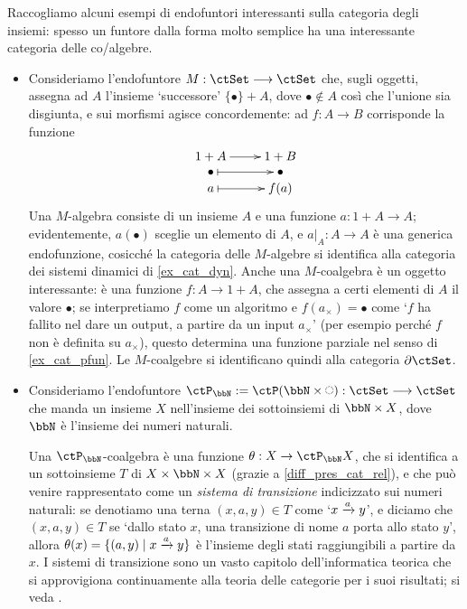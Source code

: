 \begin{examples}
	Raccogliamo alcuni esempi di endofuntori interessanti sulla categoria degli insiemi: spesso un funtore dalla forma molto semplice ha una interessante categoria delle co/algebre.
	\begin{itemize}
		\item Consideriamo l'endofuntore \(M : \ctSet\fun\ctSet\) che, sugli oggetti, assegna ad \(A\) l'insieme `successore' \(\{\bullet\}+A\), dove \(\bullet\notin A\) così che l'unione sia disgiunta, e sui morfismi agisce concordemente: ad \(f : A\to B\) corrisponde la funzione
		      \[\xymatrix@R=0mm{
			      1+A \ar[r] & 1+B \\
			      \bullet \ar@{|->}[r] & \bullet \\
			      a \ar@{|->}[r] & f(a)
			      }\]
		      Una \(M\)-algebra consiste di un insieme \(A\) e una funzione \(a : 1+A\to A\); evidentemente, \(a(\bullet)\) sceglie un elemento di \(A\), e \(a|_A : A\to A\) è una generica endofunzione, cosicché la categoria delle \(M\)-algebre si identifica alla categoria dei sistemi dinamici di \ref{ex_cat_dyn}. Anche una \(M\)-coalgebra è un oggetto interessante: è una funzione \(f : A\to 1+A\), che assegna a certi elementi di \(A\) il valore \(\bullet\); se interpretiamo \(f\) come un algoritmo e \(f(a_\times)=\bullet\) come `\(f\) ha fallito nel dare un output, a partire da un input \(a_\times\)' (per esempio perché \(f\) non è definita su \(a_\times\)), questo determina una funzione parziale nel senso di \ref{ex_cat_pfun}. Le \(M\)-coalgebre si identificano quindi alla categoria \(\pSet\).
		\item Consideriamo l'endofuntore \(\ctP_\bbN:=\ctP(\bbN\times\blank):\ctSet\fun\ctSet\) che manda un insieme \(X\) nell'insieme dei sottoinsiemi di \(\bbN\times X\), dove \(\bbN\) è l'insieme dei numeri naturali.

		      Una \(\ctP_\bbN\)-coalgebra è una funzione \(\theta : X\to \ctP_\bbN X\), che si identifica a un sottoinsieme \(T\) di \(X\times\bbN\times X\) (grazie a \ref{diff_pres_cat_rel}), e che può venire rappresentato come un \emph{sistema di transizione} indicizzato sui numeri naturali: se denotiamo una terna \((x,a,y)\in T\) come `\(x\xrightarrow{a}y\)', e diciamo che \((x,a,y)\in T\) se `dallo stato \(x\), una transizione di nome \(a\) porta allo stato \(y\)', allora \(\theta(x) = \{(a,y)\mid x\xrightarrow{a}y\}\) è l'insieme degli stati raggiungibili a partire da \(x\). I sistemi di transizione sono un vasto capitolo dell'informatica teorica che si approvigiona continuamente alla teoria delle categorie per i suoi risultati; si veda \cite{sangiorgi2011introduction,sangiorgi2012advanced,Jacobs2016}.


\end{itemize}
\end{examples}
